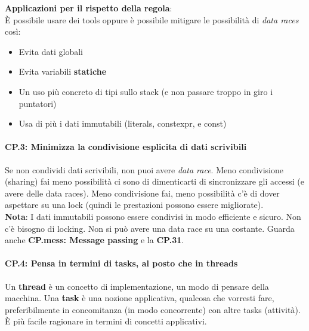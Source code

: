 \textsf{\small \textbf{Applicazioni per il rispetto della regola}: } \\

\textsf{\small È possibile usare dei tools oppure è possibile mitigare le possibilità di \emph{data races} così: }

\begin{itemize}
	\item \textsf{\small Evita dati globali}
	\item \textsf{\small Evita variabili \textbf{statiche}}
	\item \textsf{\small Un uso più concreto di tipi sullo stack (e non passare troppo in giro i puntatori)}
	\item \textsf{\small Usa di più i dati immutabili (literals, constexpr, e const)}
\end{itemize}

\paragraph{CP.3: Minimizza la condivisione esplicita di dati scrivibili}

\textsf{\small Se non condividi dati scrivibili, non puoi avere \emph{data race}. Meno condivisione (sharing) fai meno possibilità ci sono di dimenticarti di sincronizzare gli accessi (e avere delle data races). Meno condivisione fai, meno possibilità c'è di dover aspettare su una lock (quindi le prestazioni possono essere migliorate).} \\

\textsf{\small \textbf{Nota}: I dati immutabili possono essere condivisi in modo efficiente e sicuro. Non c'è bisogno di locking. Non si può avere una data race su una costante. Guarda anche \textbf{CP.mess: Message passing} e la \textbf{CP.31}.} \\

\paragraph{CP.4: Pensa in termini di tasks, al posto che in threads}

\textsf{\small Un \textbf{thread} è un concetto di implementazione, un modo di pensare della macchina. Una \textbf{task} è una nozione applicativa, qualcosa che vorresti fare, preferibilmente in concomitanza (in modo concorrente) con altre tasks (attività). È più facile ragionare in termini di concetti applicativi.} \\


